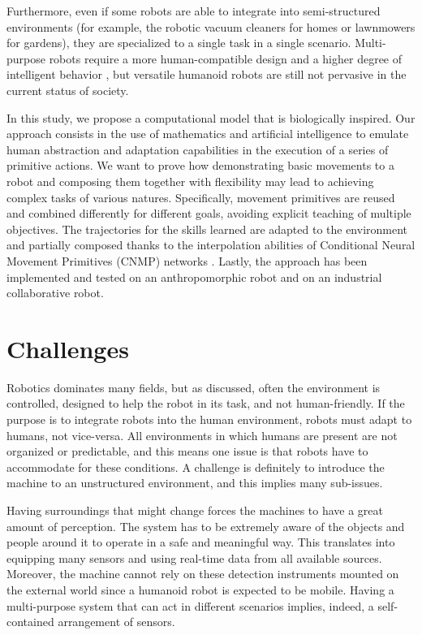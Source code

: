 Furthermore, even if some robots are able to integrate into semi-structured environments (for example, the robotic vacuum cleaners for homes or lawnmowers for gardens), they are specialized to a single task in a single scenario. Multi-purpose robots require a more human-compatible design and a higher degree of intelligent behavior \cite{dechant2021toward}, but versatile humanoid robots are still not pervasive in the current status of society. 

In this study, we propose a computational model that is biologically inspired. Our approach consists in the use of mathematics and artificial intelligence to emulate human abstraction and adaptation capabilities in the execution of a series of primitive actions. 
We want to prove how demonstrating basic movements to a robot and composing them together with flexibility may lead to achieving complex tasks of various natures.
Specifically, movement primitives are reused and combined differently for different goals, avoiding explicit teaching of multiple objectives. The trajectories for the skills learned are adapted to the environment and partially composed thanks to the interpolation abilities of Conditional Neural Movement Primitives (CNMP) networks \cite{Ugur-RSS-19}.
Lastly, the approach has been implemented and tested on an anthropomorphic robot and on an industrial collaborative robot.



\section{Challenges}
Robotics dominates many fields, but as discussed, often the environment is controlled, designed to help the robot in its task, and not human-friendly. If the purpose is to integrate robots into the human environment, robots must adapt to humans, not vice-versa. All environments in which humans are present are not organized or predictable, and this means one issue is that robots have to accommodate for these conditions. A challenge is definitely to introduce the machine to an unstructured environment, and this implies many sub-issues. 

Having surroundings that might change forces the machines to have a great amount of perception. The system has to be extremely aware of the objects and people around it to operate in a safe and meaningful way. This translates into equipping many sensors and using real-time data from all available sources. Moreover, the machine cannot rely on these detection instruments mounted on the external world since a humanoid robot is expected to be mobile. Having a multi-purpose system that can act in different scenarios implies, indeed, a self-contained arrangement of sensors.

